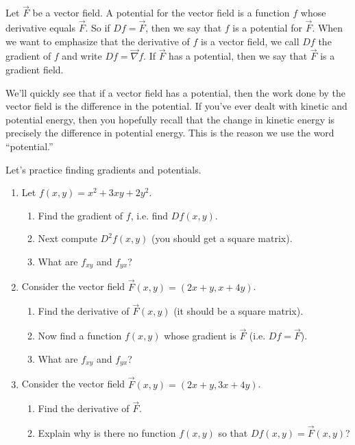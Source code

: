 \begin{definition}
%
 Let $\vec F$ be a vector field.  A potential for the vector field is a function $f$ whose derivative equals $\vec F$. So if $Df=\vec F$, then we say that $f$ is a potential for $\vec F$. When we want to emphasize that the derivative of $f$ is a vector field, we call $Df$ the gradient of $f$ and write $Df = \vec \nabla f$.
 If $\vec F$ has a potential, then we say that $\vec F$ is a gradient field. 
\end{definition}

We'll quickly see that if a vector field has a potential, then the work done by the vector field is the difference in the potential.  If you've ever dealt with kinetic and potential energy, then you hopefully recall that the change in kinetic energy is precisely the difference in potential energy.  This is the reason we use the word ``potential.''

\begin{problem}
%
Let's practice finding gradients and potentials. 
\begin{enumerate}
 \item  Let $f(x,y) = x^2+3xy+2y^2$. 
	\begin{enumerate}
		\item Find the gradient of $f$, i.e. find $Df(x,y)$. 
		\item Next compute $D^2f(x,y)$ (you should get a square matrix). 
		\item What are $f_{xy}$ and $f_{yx}$?
	\end{enumerate}
 \item Consider the vector field $\vec F(x,y)=(2x+y,x+4y)$. 
	\begin{enumerate}
		\item Find the derivative of $\vec F(x,y)$ (it should be a square matrix). 
		\item Now find a function $f(x,y)$ whose gradient is $\vec F$ (i.e. $Df=\vec F$). 
		\item What are $f_{xy}$ and $f_{yx}$?
	\end{enumerate}
 \item {}%
Consider the vector field $\vec F(x,y)=(2x+y,3x+4y)$.  
	\begin{enumerate}
		\item Find the derivative of $\vec F$.  
		\item Explain why is there no function $f(x,y)$ so that $Df(x,y)=\vec F(x,y)$? 
	\end{enumerate}
\end{enumerate}
\end{problem}

